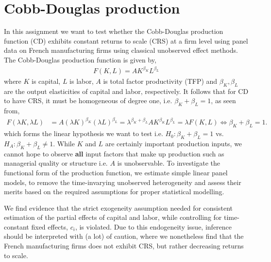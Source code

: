 \section{Cobb-Douglas production} \label{sec:intro}

In this assignment we want to test whether the Cobb-Douglas production function (CD) exhibits constant returns to scale (CRS) at a firm level using panel data on French manufacturing firms using classical unobserved effect methods. The Cobb-Douglas production function is given by,
\begin{align} \label{eq:CD}
    F(K,L) = A K^{\beta_K} L^{\beta_L}
\end{align}
where $K$ is capital, $L$ is labor, $A$ is total factor productivity (TFP) and $\beta_K, \beta_L$ are the output elasticities of capital and labor, respectively.
It follows that for CD to have CRS, it must be homogeneous of degree one, i.e. $\beta_K + \beta_L = 1$, as seen from,
\begin{align*} 
    F(\lambda K, \lambda L) &= A (\lambda K)^{\beta_K} (\lambda L)^{\beta_L} = \lambda^{\beta_K + \beta_L} A K^{\beta_K} L^{\beta_L} = \lambda F(K,L) \iff \beta_K + \beta_L = 1.
\end{align*} 
which forms the linear hypothesis we want to test i.e. $H_0: \beta_K + \beta_L = 1$ vs. $H_A: \beta_K + \beta_L \neq 1$.
While $K$ and $L$ are certainly important production inputs, we cannot hope to observe \textbf{all} input factors that make up production such as managerial quality or structure i.e. $A$ is unobservable. To investigate the functional form of the production function, we estimate simple linear panel models, to remove the time-invarying unobserved heterogeneity and assess their merits based on the required assumptions for proper statistical modelling.

We find evidence that the strict exogeneity assumption needed for consistent estimation of the partial effects of capital and labor, while controlling for time-constant fixed effects, $c_i$, is violated. Due to this endogeneity issue, inference should be interpreted with (a lot) of caution, where we nonetheless find that the French manufacturing firms does not exhibit CRS, but rather decreasing returns to scale. 

